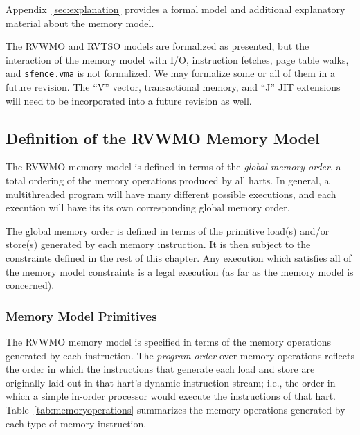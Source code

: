 Appendix~\ref{sec:explanation} provides a formal model and additional explanatory material about the memory model.


\begin{commentary}
  The RVWMO and RVTSO models are formalized as presented, but the interaction of the memory model with I/O, instruction fetches, page table walks, and {\tt sfence.vma} is not formalized.  We may formalize some or all of them in a future revision.  The ``V'' vector, transactional memory, and ``J'' JIT extensions will need to be incorporated into a future revision as well.
\end{commentary}

\subsection{Definition of the RVWMO Memory Model}
\label{sec:definition}

The RVWMO memory model is defined in terms of the {\em global memory order}, a total ordering of the memory operations produced by all harts.
In general, a multithreaded program will have many different possible executions, and each execution will have its its own corresponding global memory order.

The global memory order is defined in terms of the primitive load(s) and/or store(s) generated by each memory instruction.
It is then subject to the constraints defined in the rest of this chapter.
Any execution which satisfies all of the memory model constraints is a legal execution (as far as the memory model is concerned).

\subsubsection*{Memory Model Primitives}
The RVWMO memory model is specified in terms of the memory operations generated by each instruction.
The {\em program order} over memory operations reflects the order in which the instructions that generate each load and store are originally laid out in that hart's dynamic instruction stream; i.e., the order in which a simple in-order processor would execute the instructions of that hart.
Table~\ref{tab:memoryoperations} summarizes the memory operations generated by each type of memory instruction.

